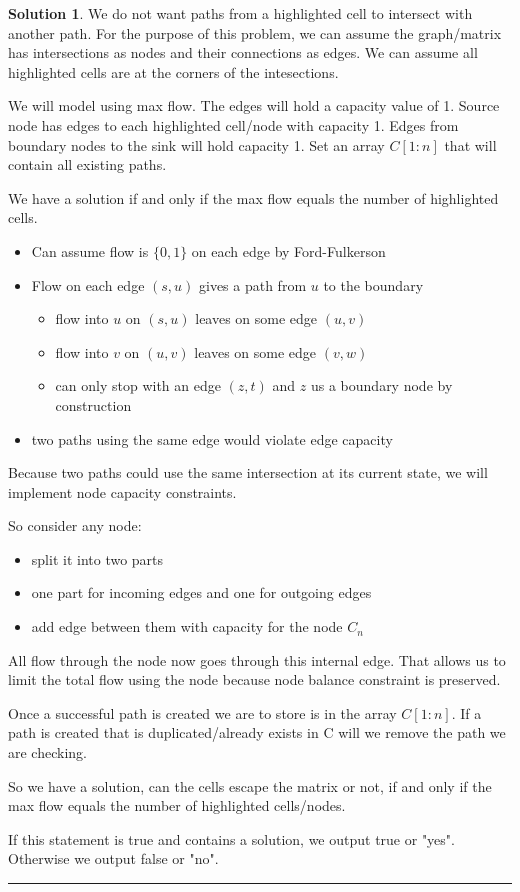 \documentclass{article}
\theoremstyle{definition}
\def\fline{\rule{0.75\linewidth}{0.5pt}}
\newcommand{\finishline}{\begin{center}\fline\end{center}}
\newtheorem*{solution*}{Solution}
\newenvironment{solution}{\begin{solution*}}{{\finishline} \end{solution*}}
\begin{document}
\begin{solution}
	\item We do not want paths from a highlighted cell to intersect with another path. For the purpose of this problem, we can assume the graph/matrix has intersections as nodes and their connections as edges. We can assume all highlighted cells are at the corners of the intesections.
	\item We will model using max flow. The edges will hold a capacity value of 1. Source node has edges to each highlighted cell/node with capacity 1. Edges from boundary nodes to the sink will hold capacity 1. Set an array $C[1:n]$ that will contain all existing paths.
	\item We have a solution if and only if the max flow equals the number of highlighted cells. 
	\item\begin{itemize}
		\item Can assume flow is $\{0, 1\}$ on each edge by Ford-Fulkerson
		\item Flow on each edge $(s, u)$ gives a path from $u$ to the boundary
		\begin{itemize}
			\item flow into $u$ on $(s, u)$ leaves on some edge $(u, v)$
			\item flow into $v$ on $(u, v)$ leaves on some edge $(v, w)$
			\item can only stop with an edge $(z, t)$ and $z$ us a boundary node by construction
			\end{itemize}
		\item two paths using the same edge would violate edge capacity
	\end{itemize}
	\item Because two paths could use the same intersection at its current state, we will implement node capacity constraints. 
	\item So consider any node:
		\item\begin{itemize}
		\item split it into two parts
		\item one part for incoming edges and one for outgoing edges
		\item add edge between them with capacity for the node $C_n$
		\end{itemize}
	\item All flow through the node now goes through this internal edge. That allows us to limit the total flow using the node because node balance constraint is preserved.
	\item Once a successful path is created we are to store is in the array $C[1:n]$. If a path is created that is duplicated/already exists in C will we remove the path we are checking.
	\item So we have a solution, can the cells escape the matrix or not, if and only if the max flow equals the number of highlighted cells/nodes.
	\item If this statement is true and contains a solution, we output true or "yes". Otherwise we output false or "no".


\end{solution}
\end{document}
